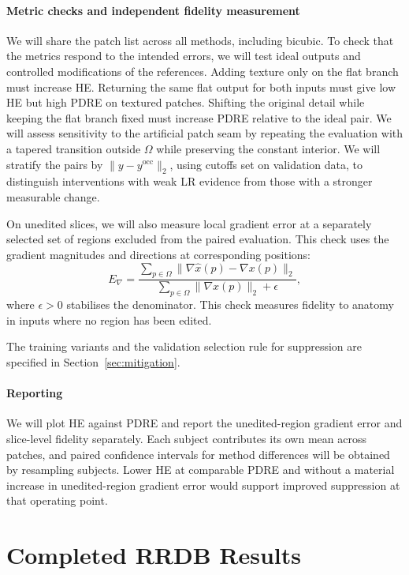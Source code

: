 \documentclass[journal]{IEEEtran}
\begin{document}
\paragraph{Metric checks and independent fidelity measurement}
We will share the patch list across all methods, including bicubic. To check that the metrics respond to the intended errors, we will test ideal outputs and controlled modifications of the references. Adding texture only on the flat branch must increase HE. Returning the same flat output for both inputs must give low HE but high PDRE on textured patches. Shifting the original detail while keeping the flat branch fixed must increase PDRE relative to the ideal pair. We will assess sensitivity to the artificial patch seam by repeating the evaluation with a tapered transition outside $\Omega$ while preserving the constant interior. We will stratify the pairs by $\|y-y^{\mathrm{occ}}\|_2$, using cutoffs set on validation data, to distinguish interventions with weak LR evidence from those with a stronger measurable change.

On unedited slices, we will also measure local gradient error at a separately selected set of regions excluded from the paired evaluation. This check uses the gradient magnitudes and directions at corresponding positions:
\begin{equation}
 E_{\nabla} =
 \frac{\sum_{p\in\Omega}\lVert\nabla\hat{x}(p)-\nabla x(p)\rVert_2}
      {\sum_{p\in\Omega}\lVert\nabla x(p)\rVert_2+\epsilon},
 \label{eq:local-gradient}
\end{equation}
where $\epsilon>0$ stabilises the denominator. This check measures fidelity to anatomy in inputs where no region has been edited.

The training variants and the validation selection rule for suppression are specified in Section~\ref{sec:mitigation}.

\paragraph{Reporting}
We will plot HE against PDRE and report the unedited-region gradient error and slice-level fidelity separately. Each subject contributes its own mean across patches, and paired confidence intervals for method differences will be obtained by resampling subjects. Lower HE at comparable PDRE and without a material increase in unedited-region gradient error would support improved suppression at that operating point.

\section{Completed RRDB Results}
\end{document}

